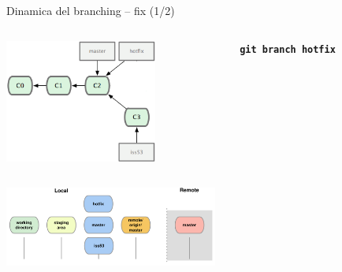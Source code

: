 \documentclass{beamer}
\begin{document}
\begin{frame}{\centerline{Dinamica del branching -- fix (1/2)}}
  \begin{columns}
    \begin{column}{0.6\linewidth}
      \begin{center}
        \includegraphics[width=5cm]{UniBo.IDSEPC.A2022.LavoroCondiviso/18333fig0313b-tn}
      \end{center}
    \end{column}
    \begin{column}{0.45\linewidth}
      \begin{center}
        \texttt{\textbf{git branch hotfix}}\\
      \end{center}
    \end{column}
  \end{columns}
  \begin{center}
    \includegraphics[width=7cm]{UniBo.IDSEPC.A2022.LavoroCondiviso/git-branch2}
  \end{center}
\end{frame}
\end{document}
